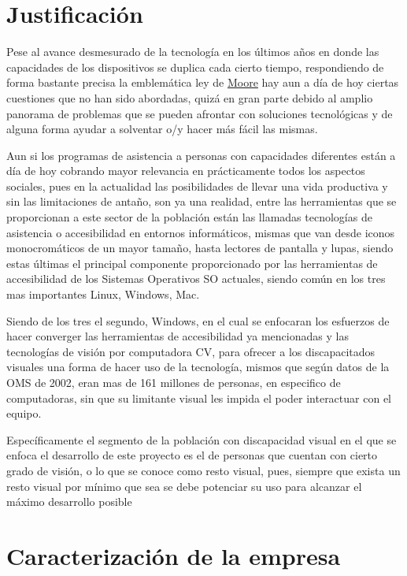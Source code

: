 \documentclass[12pt]{book} %
\begin{document}
\newpage
\section{Justificación \label{justificacion}}
	Pese al avance desmesurado de la tecnología en los últimos años en donde las capacidades de los dispositivos se
	duplica cada cierto tiempo, respondiendo de forma bastante precisa la emblemática ley de 
	\href{https://en.wikipedia.org/wiki/Moore's_law}{Moore} hay aun a día de hoy
	ciertas cuestiones que no han sido abordadas, quizá en gran parte debido al amplio panorama de problemas que se
	pueden afrontar con soluciones tecnológicas y de alguna forma ayudar a solventar o/y hacer más fácil las mismas.
	
	Aun si los programas de asistencia a personas con capacidades diferentes están a día de hoy cobrando mayor 			  	
	relevancia en prácticamente todos los aspectos sociales, pues en la actualidad las posibilidades de llevar una vida
	productiva y sin las limitaciones de antaño, son ya una realidad, entre las herramientas que se proporcionan a este
	sector de la población están las llamadas tecnologías de asistencia o accesibilidad en entornos informáticos, mismas
	que van desde iconos monocromáticos de un mayor tamaño, hasta lectores de pantalla y lupas, siendo estas últimas el
	principal componente proporcionado por las herramientas de accesibilidad de los Sistemas Operativos \gls{SO} actuales,
	siendo común en los tres mas importantes \gls{Linux}, \gls{Windows}, \gls{Mac}.
	
	Siendo de los tres el segundo, Windows, en el cual se enfocaran los esfuerzos de hacer converger las herramientas de
	accesibilidad ya mencionadas y las tecnologías de visión por computadora CV, para ofrecer a los discapacitados 
	visuales una forma de hacer uso de la tecnología, mismos que según datos de la OMS de 2002, eran mas de 161 millones
	de personas, en especifico de computadoras, sin que su limitante visual les impida el poder interactuar con el 
	equipo.
	
	Específicamente el segmento de la población con discapacidad visual en el que se enfoca el desarrollo de este
	proyecto es el de personas que cuentan con cierto grado de visión, o lo que se conoce como resto visual, pues,
	siempre que exista un resto visual por mínimo que sea se debe potenciar su uso para alcanzar el máximo desarrollo
	posible

\newpage 
\section{Caracterización de la empresa}
\end{document}
